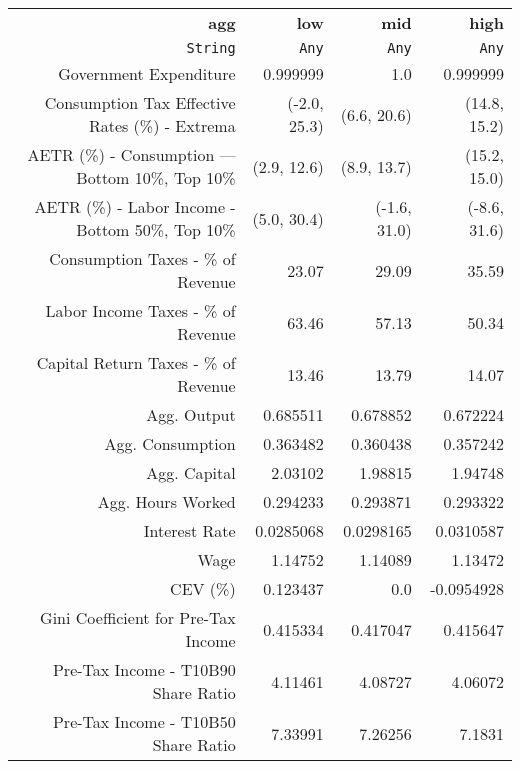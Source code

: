 \begin{tabular}{rrrr}
  \hline
  \textbf{agg} & \textbf{low} & \textbf{mid} & \textbf{high} \\
  \texttt{String} & \texttt{Any} & \texttt{Any} & \texttt{Any} \\\hline
  Government Expenditure & 0.999999 & 1.0 & 0.999999 \\
  Consumption Tax Effective Rates (\%) - Extrema & (-2.0, 25.3) & (6.6, 20.6) & (14.8, 15.2) \\
  AETR (\%) - Consumption — Bottom 10\%, Top 10\% & (2.9, 12.6) & (8.9, 13.7) & (15.2, 15.0) \\
  AETR (\%) - Labor Income - Bottom 50\%, Top 10\% & (5.0, 30.4) & (-1.6, 31.0) & (-8.6, 31.6) \\
  Consumption Taxes - \% of Revenue & 23.07 & 29.09 & 35.59 \\
  Labor Income Taxes - \% of Revenue & 63.46 & 57.13 & 50.34 \\
  Capital Return Taxes - \% of Revenue & 13.46 & 13.79 & 14.07 \\
  Agg. Output & 0.685511 & 0.678852 & 0.672224 \\
  Agg. Consumption & 0.363482 & 0.360438 & 0.357242 \\
  Agg. Capital & 2.03102 & 1.98815 & 1.94748 \\
  Agg. Hours Worked & 0.294233 & 0.293871 & 0.293322 \\
  Interest Rate & 0.0285068 & 0.0298165 & 0.0310587 \\
  Wage & 1.14752 & 1.14089 & 1.13472 \\
  CEV (\%) & 0.123437 & 0.0 & -0.0954928 \\
  Gini Coefficient for Pre-Tax Income & 0.415334 & 0.417047 & 0.415647 \\
  Pre-Tax Income - T10B90 Share Ratio & 4.11461 & 4.08727 & 4.06072 \\
  Pre-Tax Income - T10B50 Share Ratio & 7.33991 & 7.26256 & 7.1831 \\\hline
\end{tabular}
